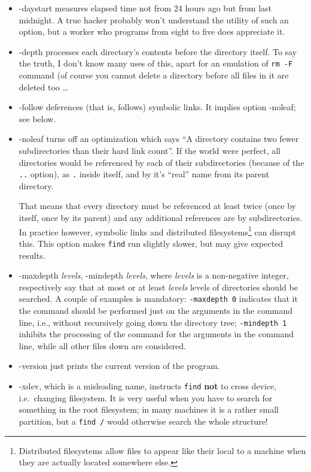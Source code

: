 \begin{itemize}

\item {\sf -daystart} measures elapsed time not from 24 hours ago but from
last midnight. A true hacker probably won't understand the utility of
such an option, but a worker who programs from eight to five does
appreciate it.

\item {\sf -depth} processes each directory's contents before the
directory itself. To say the truth, I don't know many uses of this, apart
for an emulation of {\tt rm -F} command (of course you cannot delete a
directory before all files in it are deleted too \ldots

\item {\sf -follow} deferences (that is, follows) symbolic links. It
implies option -noleaf; see below.

\item {\sf -noleaf} turns off an optimization which says ``A directory
  contains two fewer subdirectories than their hard link count''. If
  the world were perfect, all directories would be referenced by each
  of their subdirectories (because of the {\tt ..} option), as {\tt .}
  inside itself, and by it's ``real'' name from its parent directory.

  That means that every directory must be referenced at least twice
  (once by itself, once by its parent) and any additional references
  are by subdirectories. In practice however, symbolic links and
  distributed filesystems\footnote{Distributed filesystems allow files
    to appear like their local to a machine when they are actually located
    somewhere else.} can disrupt this. This option makes {\tt find}
  run slightly slower, but may give expected results.

\item {\sf -maxdepth {\it levels\/}}, {\sf -mindepth {\it levels\/}}, where
{\it levels} is a non-negative integer, respectively say that at most or
at least {\it levels} levels of directories should be searched. A couple
of examples is mandatory: {\tt -maxdepth 0} indicates that it the command
should be performed just on the arguments in the command line, i.e.,
without recursively going down the directory tree; {\tt -mindepth 1}
inhibits the processing of the command for the arguments in the command
line, while all other files down are considered.

\item {\sf -version} just prints the current version of the program.

\item {\sf -xdev}, which is a misleading name, instructs {\tt find} {\bf
not} to cross device, i.e.\ changing filesystem. It is very useful when
you have to search for something in the root filesystem; in many machines
it is a rather small partition, but a {\tt find /} would otherwise search
the whole structure!

\end{itemize}

